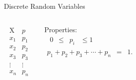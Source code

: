 \begin{frame}{Discrete Random Variables}

  \begin{columns}

    \begin{eqnarray*}
      \begin{array}{l|l}
        \mathrm{X} & p \\ \hline
        x_1 & p_1 \\
        x_2 & p_2 \\
        x_3 & p_3 \\
        \vdots & \vdots \\
        x_n & p_n
      \end{array}
    \end{eqnarray*}

    Properties:
    \begin{eqnarray*}
      \begin{array}{rcccl}
        0 & \leq & p_i & \leq 1
      \end{array}
      \\
      p_1 + p_2 + p_3 + \cdots + p_n & = & 1.
    \end{eqnarray*}

  \end{columns}
  
\end{frame}


